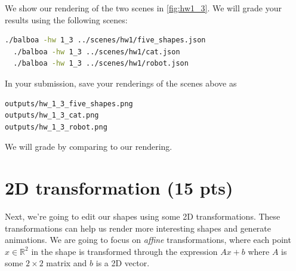 We show our rendering of the two scenes in \cref{fig:hw1_3}.
We will grade your results using the following scenes:
\begin{lstlisting}[language=bash]
  ./balboa -hw 1_3 ../scenes/hw1/five_shapes.json
  ./balboa -hw 1_3 ../scenes/hw1/cat.json
  ./balboa -hw 1_3 ../scenes/hw1/robot.json
\end{lstlisting}
In your submission, save your renderings of the scenes above as
\begin{lstlisting}[language=bash]
outputs/hw_1_3_five_shapes.png
outputs/hw_1_3_cat.png
outputs/hw_1_3_robot.png
\end{lstlisting}
We will grade by comparing to our rendering.

\section{2D transformation (15 pts)}

Next, we're going to edit our shapes using some 2D transformations. These transformations can help us render more interesting shapes and generate animations. We are going to focus on \emph{affine} transformations, where each point $x \in \mathbb{R}^2$ in the shape is transformed through the expression $Ax + b$ where $A$ is some $2 \times 2$ matrix and $b$ is a 2D vector. 

